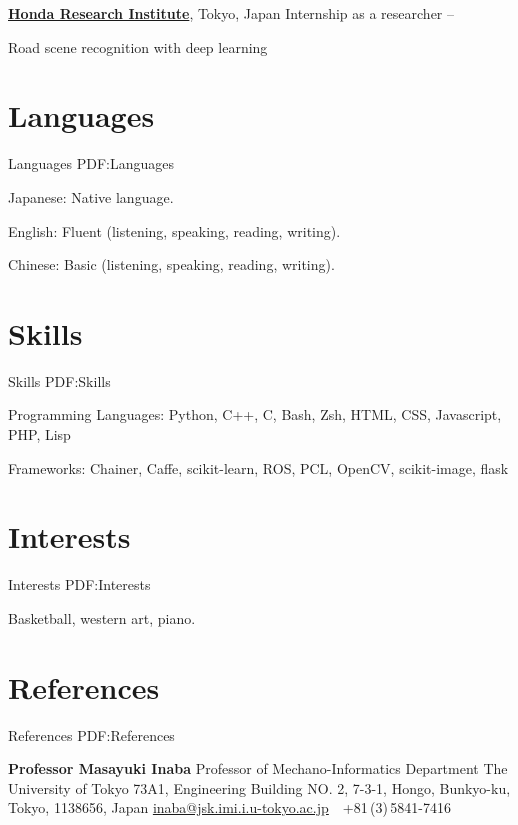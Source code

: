 \documentclass[letterpaper,MMMyyyy,nonstop]{simpleresumecv}
\begin{document}
\begin{body}
\href{http://www.honda-ri.com/}
{\textbf{Honda Research Institute}},
Tokyo, Japan
\GapNoBreak
\BulletItem
Internship as a researcher
\hfill
{} --
\begin{detail}
\SubBulletItem
Road scene recognition with deep learning
\end{detail}


\section
{Languages}
{Languages}
{PDF:Languages}

\BulletItem
Japanese: Native language.

\GapNoBreak
\BulletItem
English: Fluent (listening, speaking, reading, writing).

\GapNoBreak
\BulletItem
Chinese: Basic (listening, speaking, reading, writing).


\section
{Skills}
{Skills}
{PDF:Skills}

\BulletItem
Programming Languages: Python, C++, C, Bash, Zsh, HTML, CSS, Javascript, PHP, Lisp

\GapNoBreak
\BulletItem
Frameworks: Chainer, Caffe, scikit-learn, ROS, PCL, OpenCV, scikit-image, flask


\section
{Interests}
{Interests}
{PDF:Interests}

Basketball,
western art,
piano.


\section
{References}
{References}
{PDF:References}

\BulletItem
\textbf{Professor Masayuki Inaba}
\newline
Professor of Mechano-Informatics Department
\newline
The University of Tokyo
\newline
73A1, Engineering Building NO. 2, 7-3-1, Hongo, Bunkyo-ku, Tokyo, 1138656, Japan
\newline
\href{mailto:inaba@jsk.imi.i.u-tokyo.ac.jp}
{inaba@jsk.imi.i.u-tokyo.ac.jp}
\,\SubBulletSymbol\,
+81\,(3)\,5841-7416


\end{body}
\end{document}
